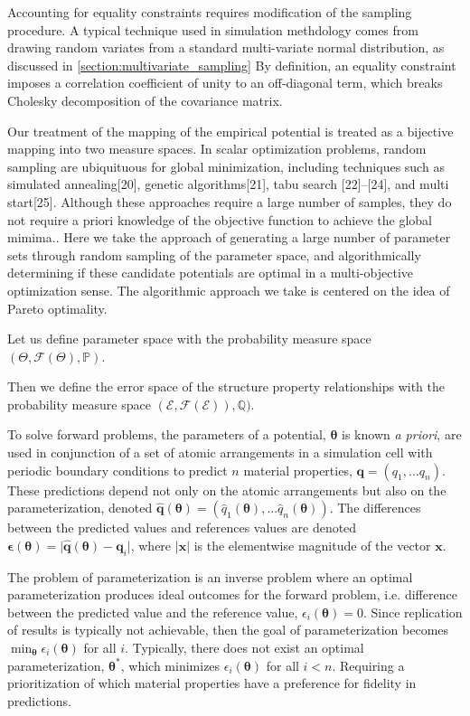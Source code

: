 Accounting for equality constraints requires modification of the sampling procedure.  A typical technique used in simulation methdology comes from drawing random variates from a standard multi-variate normal distribution, as discussed in \ref{section:multivariate_sampling}  By definition, an equality constraint imposes a correlation coefficient of unity to an off-diagonal term, which breaks Cholesky decomposition of the covariance matrix.

Our treatment of the mapping of the empirical potential is treated as a bijective mapping into two measure spaces.
In scalar optimization problems, random sampling are ubiquituous for global minimization, including techniques such as simulated annealing[20], genetic algorithms[21], tabu search [22]–[24], and multi start[25].  Although these approaches require a large number of samples, they do not require a priori knowledge of the objective function to achieve the global mimima..  Here we take the approach of generating a large number of parameter sets through random sampling of the parameter space, and algorithmically determining if these candidate potentials are optimal in a multi-objective optimization sense.  The algorithmic approach we take is centered on the idea of Pareto optimality.

Let us define parameter space with the probability measure space $(\Theta,\mathcal{F}(\Theta),\mathbb{P})$.

Then we define the error space of the structure property relationships with the probability measure space $(\mathcal{E},\mathcal{F}(\mathcal{E})),\mathbb{Q})$.

To solve forward problems, the parameters of a potential, $\bm{\theta}$ is known \emph{a priori}, are used in conjunction of a set of atomic arrangements in a simulation cell with periodic boundary conditions to predict $n$ material properties, $\bm{q} = (q_1,...q_n)$.  These predictions depend not only on the atomic arrangements but also on the parameterization, denoted
$\bm{\hat{q}}(\bm{\theta}) =
    (\hat{q}_1(\bm{\theta}),...\hat{q}_n(\bm{\theta}))$.
The differences between the predicted values and references values are denoted
$\bm{\epsilon}(\bm{\theta}) =
    \lvert \bm{\hat{q}}(\bm{\theta})
         - \bm{q}_i
    \rvert$,
where $|\bm{x}|$ is the elementwise magnitude of the vector $\bm{x}$.

The problem of parameterization is an inverse problem where an optimal parameterization produces ideal outcomes for the forward problem, i.e. difference between the predicted value and the reference value,
$\epsilon_i(\bm{\theta}) = 0$.
Since replication of results is typically not achievable, then the goal of parameterization becomes
$\min_{\bm{\theta}} \epsilon_i(\bm{\theta})$
for all $i$.  Typically, there does not exist an optimal parameterization, $\bm{\theta}^*$, which minimizes $\epsilon_i(\bm{\theta})$ for all $i < n$.  Requiring a prioritization of which material properties have a preference for fidelity in predictions.

